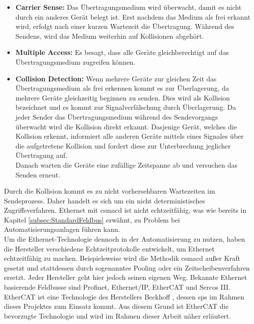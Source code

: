 \documentclass[ a4paper,
                oneside,
                toc=bibliography,
                toc=listof
                ]{scrbook}
\begin{document}
	\begin{itemize}
		\item \textbf{Carrier Sense:} Das Übertragungsmedium wird überwacht, damit es nicht durch ein anderes Gerät belegt ist. Erst nachdem das Medium als frei erkannt wird, erfolgt nach einer kurzen Wartezeit die Übertragung. Während des Sendens, wird das Medium weiterhin auf Kollisionen abgehört.
		\item \textbf{Multiple Access:} Es besagt, dass alle Geräte gleichberechtigt auf das Übertragungsmedium zugreifen können.
		\item \textbf{Collision Detection:} Wenn mehrere Geräte zur gleichen Zeit das Übertragungsmedium als frei erkennen kommt es zur Überlagerung, da mehrere Geräte gleichzeitig beginnen zu senden. Dies wird als Kollision bezeichnet und es kommt zur Signalverfälschung durch Überlagerung. Da jeder Sender das Übertragungsmedium während des Sendevorgangs überwacht wird die Kollision direkt erkannt. Dasjenige Gerät, welches die Kollision erkennt, informiert alle anderen Geräte mittels eines Signales über die aufgetretene Kollision und fordert diese zur Unterbrechung jeglicher Übertragung auf. \\
		Danach warten die Geräte eine zufällige Zeitspanne ab und versuchen das Senden erneut. \cite{riggert2002rechnernetze}
	\end{itemize}
	Durch die Kollision kommt es zu nicht vorhersehbaren Wartezeiten im Sendeprozess. Daher handelt es sich um ein nicht deterministisches Zugriffsverfahren. Ethernet mit \acs{csmacd} ist nicht echtzeitfähig, was wie bereits in Kapitel \ref{subsec:StandardFeldbus} erwähnt, zu Problem bei Automatisierungsanlagen führen kann.\\
	Um die Ethernet-Technologie dennoch in der Automatisierung zu nutzen, haben die Hersteller verschiedene Echtzeitprotokolle entwickelt, um Ethernet echtzeitfähig zu machen. Beispielsweise wird die Methodik \acs{csmacd} außer Kraft gesetzt und stattdessen durch sogenanntes \glqq Pooling\grqq{} oder ein Zeitscheibenverfahren ersetzt. Jeder Hersteller geht hier jedoch seinen eigenen Weg.	Bekannte Ethernet basierende Feldbusse sind \glqq Profinet\grqq{}, \glqq Ethernet/IP\grqq{}, \glqq EtherCAT\grqq{} und \glqq Sercos III\grqq{}.
	EtherCAT ist eine Technologie des Herstellers \glqq Beckhoff\grqq{} , dessen \ac{sps} im Rahmen dieses Projektes zum Einsatz kommt. Aus diesem Grund ist EtherCAT die bevorzugte Technologie und wird im Rahmen dieser Arbeit näher erläutert. \cite{ethercat} \cite{riggert2002rechnernetze}\
	\\
\end{document}
